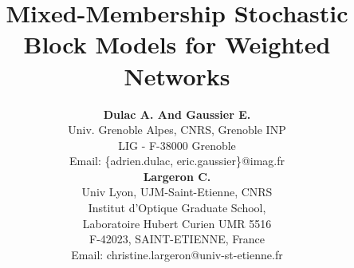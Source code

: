 \documentclass[letterpaper]{article}
\begin{document}
\title{Mixed-Membership Stochastic Block Models for Weighted Networks}


\author{{\bf Dulac A. And Gaussier E.}\\
Univ. Grenoble Alpes, CNRS, Grenoble INP\\
 LIG - F-38000 Grenoble\\
Email: \{adrien.dulac, eric.gaussier\}@imag.fr\\
\And
{\bf Largeron C.}\\
Univ Lyon, UJM-Saint-Etienne, CNRS\\
 Institut d'Optique Graduate School,\\
Laboratoire Hubert Curien UMR 5516\\
 F-42023, SAINT-ETIENNE, France\\ 
Email: christine.largeron@univ-st-etienne.fr\\
}	
\maketitle
\end{document}
